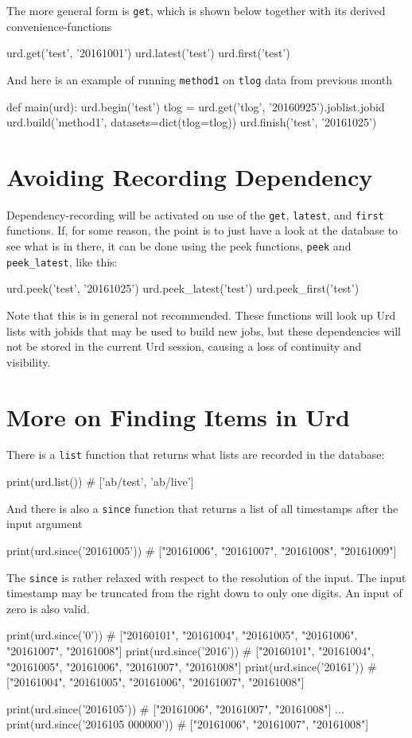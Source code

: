 The more general form is \texttt{get}, which is shown below together
with its derived convenience-functions
\begin{python}
  urd.get('test', '20161001')
  urd.latest('test')
  urd.first('test')
\end{python}
And here is an example of running \texttt{method1} on \texttt{tlog} data
from previous month
\begin{python}
def main(urd):
  urd.begin('test')
  tlog = urd.get('tlog', '20160925').joblist.jobid
  urd.build('method1', datasets=dict(tlog=tlog))
  urd.finish('test', '20161025')
\end{python}



\section{Avoiding Recording Dependency}
Dependency-recording will be activated on use of the \texttt{get},
\texttt{latest}, and \texttt{first} functions.  If, for some reason,
the point is to just have a look at the database to see what is in
there, it can be done using the peek functions, \texttt{peek} and
\texttt{peek\_latest}, like this:
\begin{python}
urd.peek('test', '20161025')
urd.peek_latest('test')
urd.peek_first('test')
\end{python}
Note that this is in general not recommended.  These functions will
look up Urd lists with jobids that may be used to build new jobs, but
these dependencies will not be stored in the current Urd session,
causing a loss of continuity and visibility.



\section{More on Finding Items in Urd}
There is a \texttt{list} function that returns what lists are recorded
in the database:
\begin{pythonBEG}
  print(urd.list())
  # ['ab/test', 'ab/live']
\end{pythonBEG}
And there is also a \texttt{since} function that returns a list of all
timestamps after the input argument
\begin{pythonMID}
  print(urd.since('20161005'))
  # ["20161006", "20161007", "20161008", "20161009"]
\end{pythonMID}
The \texttt{since} is rather relaxed with respect to the resolution of
the input.  The input timestamp may be truncated from the right down
to only one digits.  An input of zero is also valid.
\begin{pythonEND}
  print(urd.since('0'))
  # ["20160101", "20161004", "20161005", "20161006", "20161007", "20161008"]
  print(urd.since('2016'))
  # ["20160101", "20161004", "20161005", "20161006", "20161007", "20161008"]
  print(urd.since('20161'))
  # ["20161004", "20161005", "20161006", "20161007", "20161008"]

  print(urd.since('2016105'))
  # ["20161006", "20161007", "20161008"]
  ...
  print(urd.since('2016105 000000'))
  # ["20161006", "20161007", "20161008"]
\end{pythonEND}



